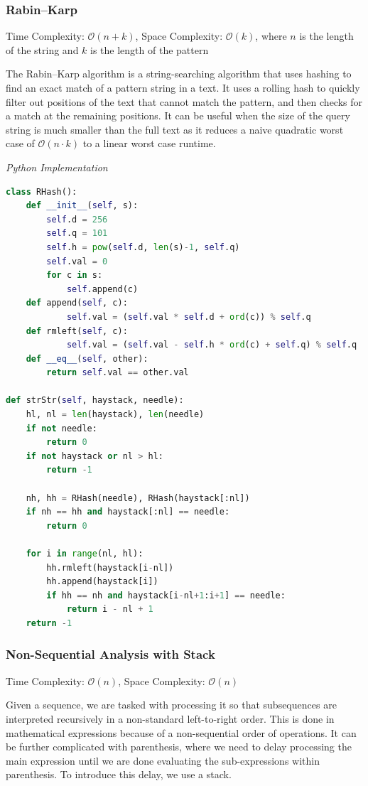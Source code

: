 \documentclass{article}
\newcommand{\bigO}{\mathcal{O}}
\begin{document}
    \subsubsection{Rabin–Karp}
    Time Complexity: $\bigO(n + k)$, Space Complexity: $\bigO(k)$, where $n$ is the length of the string and $k$ is the length of the pattern
    
    
    The Rabin–Karp algorithm is a string-searching algorithm that uses hashing to find an exact match of a pattern string in a text. It uses a rolling hash to quickly filter out positions of the text that cannot match the pattern, and then checks for a match at the remaining positions. It can be useful when the size of the query string is much smaller than the full text as it reduces a naive quadratic worst case of $\bigO(n\cdot k)$ to a linear worst case runtime.

\vspace{8pt} \emph{Python Implementation}
\begin{lstlisting}[language=Python]    
class RHash():
    def __init__(self, s):
        self.d = 256
        self.q = 101
        self.h = pow(self.d, len(s)-1, self.q)
        self.val = 0
        for c in s:
            self.append(c)
    def append(self, c):
            self.val = (self.val * self.d + ord(c)) % self.q
    def rmleft(self, c):
            self.val = (self.val - self.h * ord(c) + self.q) % self.q 
    def __eq__(self, other):            
        return self.val == other.val
        
def strStr(self, haystack, needle):
    hl, nl = len(haystack), len(needle)
    if not needle:
        return 0
    if not haystack or nl > hl:
        return -1
  
    nh, hh = RHash(needle), RHash(haystack[:nl])
    if nh == hh and haystack[:nl] == needle:
        return 0
    
    for i in range(nl, hl):
        hh.rmleft(haystack[i-nl])
        hh.append(haystack[i])
        if hh == nh and haystack[i-nl+1:i+1] == needle:
            return i - nl + 1
    return -1
\end{lstlisting}

\subsubsection{Non-Sequential Analysis with Stack}
Time Complexity: $\bigO(n)$, Space Complexity: $\bigO(n)$

Given a sequence, we are tasked with processing it so that subsequences are interpreted recursively in a non-standard left-to-right order. This is done in mathematical expressions because of a non-sequential order of operations. It can be further complicated with parenthesis, where we need to delay processing the main expression until we are done evaluating the sub-expressions within parenthesis. To introduce this delay, we use a stack.
\end{document}

